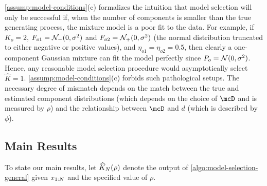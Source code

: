 \cref{assump:model-conditions}(c) formalizes the intuition that model selection will only be successful if, when the number of components is smaller than the true generating process,
the mixture model is a poor fit to the data.
For example, if $K_o = 2$, $F_{o1} = \mathcal{N}_-(0, \sigma^2)$ and $F_{o2} = \mathcal{N}_+(0, \sigma^2)$ (the normal distribution truncated to either negative or positive values), and $\eta_{o1} = \eta_{o2} = 0.5$, then clearly a one-component Gaussian mixture can fit the model perfectly since $P_o = \mathcal{N}(0, \sigma^2)$.
Hence, any reasonable model selection procedure would asymptotically select $\widehat K = 1$.
\cref{assump:model-conditions}(c) forbids such pathological setups.
The necessary degree of mismatch depends on the match between the true and estimated component distributions (which depends on the choice of $\mcD$ and is measured by $\rho$)
and the relationship between $\mcD$ and $d$ (which is described by $\phi$).

\subsection{Main Results}

To state our main results, let $\widehat{K}_{N}(\rho)$ denote the
output of \cref{algo:model-selection-general} given $x_{1:N}$ and the specified value of $\rho$.

